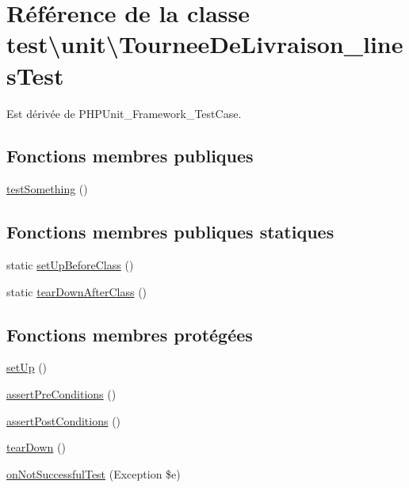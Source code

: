 \hypertarget{classtest_1_1unit_1_1TourneeDeLivraison__linesTest}{}\section{Référence de la classe test\textbackslash{}unit\textbackslash{}Tournee\+De\+Livraison\+\_\+lines\+Test}
\label{classtest_1_1unit_1_1TourneeDeLivraison__linesTest}


Est dérivée de P\+H\+P\+Unit\+\_\+\+Framework\+\_\+\+Test\+Case.

\subsection*{Fonctions membres publiques}
\begin{DoxyCompactItemize}
\item 
\hyperlink{classtest_1_1unit_1_1TourneeDeLivraison__linesTest_a1e6e923be202483cac399d112aa190da}{test\+Something} ()
\end{DoxyCompactItemize}
\subsection*{Fonctions membres publiques statiques}
\begin{DoxyCompactItemize}
\item 
static \hyperlink{classtest_1_1unit_1_1TourneeDeLivraison__linesTest_afd0e60e0f04e57c647c91b27aae5fc9e}{set\+Up\+Before\+Class} ()
\item 
static \hyperlink{classtest_1_1unit_1_1TourneeDeLivraison__linesTest_a610deecd261da0ffa391a963a1aa50ea}{tear\+Down\+After\+Class} ()
\end{DoxyCompactItemize}
\subsection*{Fonctions membres protégées}
\begin{DoxyCompactItemize}
\item 
\hyperlink{classtest_1_1unit_1_1TourneeDeLivraison__linesTest_ad5ccc0b1bd84b5bf7f8ed9bd658c868a}{set\+Up} ()
\item 
\hyperlink{classtest_1_1unit_1_1TourneeDeLivraison__linesTest_a09a90f08fe3b4b60fede17ae362030d0}{assert\+Pre\+Conditions} ()
\item 
\hyperlink{classtest_1_1unit_1_1TourneeDeLivraison__linesTest_af05af3af7053f8c460f7e7dd39c8d98f}{assert\+Post\+Conditions} ()
\item 
\hyperlink{classtest_1_1unit_1_1TourneeDeLivraison__linesTest_a6d2bdc87b4c3b696ab968815d9e4cf23}{tear\+Down} ()
\item 
\hyperlink{classtest_1_1unit_1_1TourneeDeLivraison__linesTest_a44769d685a9baf1164451ca37b809178}{on\+Not\+Successful\+Test} (Exception \$e)
\end{DoxyCompactItemize}


